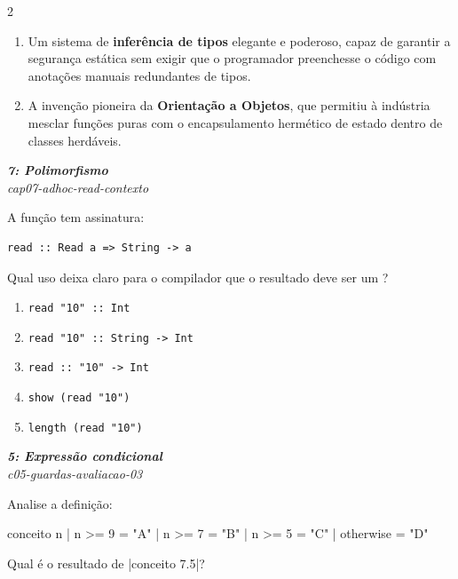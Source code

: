 \documentclass[a4paper,10pt,brazil]{article}
\begin{document}
\begin{multicols}{2}
\begin{enumerate}
  \item Um sistema de \textbf{inferência de tipos} elegante e poderoso, capaz de garantir a segurança estática sem exigir que o programador preenchesse o código com anotações manuais redundantes de tipos.

  \item A invenção pioneira da \textbf{Orientação a Objetos}, que permitiu à indústria mesclar funções puras com o encapsulamento hermético de estado dentro de classes herdáveis.


\end{enumerate}

\begin{flushright}
  \footnotesize
  \textit{\textbf{7: Polimorfismo}}\\
  \textit{cap07-adhoc-read-contexto}\\

\end{flushright}
A função  tem assinatura:

\begin{verbatim}
read :: Read a => String -> a
\end{verbatim}

Qual uso deixa claro para o compilador que o resultado deve ser um ?

\begin{enumerate}
  \item \texttt{read "10" :: Int}
  \item \texttt{read "10" :: String -> Int}
  \item \texttt{read :: "10" -> Int}
  \item \texttt{show (read "10")}
  \item \texttt{length (read "10")}

\end{enumerate}

\begin{flushright}
  \footnotesize
  \textit{\textbf{5: Expressão condicional}}\\
  \textit{c05-guardas-avaliacao-03}\\

\end{flushright}
Analise a definição:
\begin{haskellcode}
conceito n
  | n >= 9    = "A"
  | n >= 7    = "B"
  | n >= 5    = "C"
  | otherwise = "D"
\end{haskellcode}
Qual é o resultado de \haskellinline|conceito 7.5|?


\end{multicols}
\end{document}

